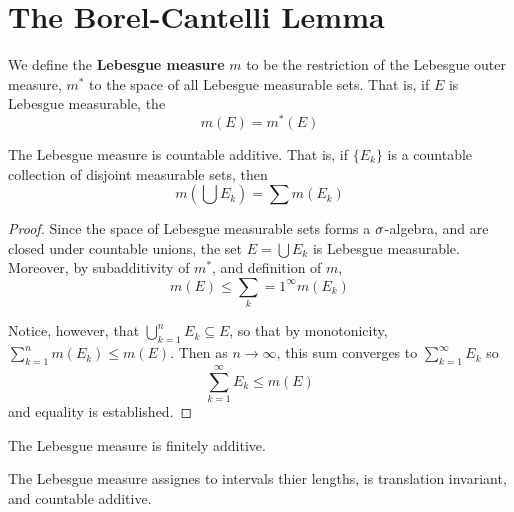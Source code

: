 \section{The Borel-Cantelli Lemma}

\begin{definition}
    We define the \textbf{Lebesgue measure} $m$ to be the restriction of the
    Lebesgue outer measure, $m^\ast$ to the space of all Lebesgue measurable
    sets. That is, if $E$ is Lebesgue measurable, the
    \begin{equation*}
        m(E)=m^\ast(E)
    \end{equation*}
\end{definition}

\begin{lemma}\label{2.4.1}
    The Lebesgue measure is countable additive. That is, if $\{E_k\}$ is a
    countable collection of disjoint measurable sets, then
    \begin{equation*}
        m(\bigcup{E_k})=\sum{m(E_k)}
    \end{equation*}
\end{lemma}
\begin{proof}
    Since the space of Lebesgue measurable sets forms a $\sigma$-algebra, and are
    closed under countable unions, the set  $E=\bigcup{E_k}$ is Lebesgue
    measurable. Moreover, by subadditivity of $m^\ast$, and definition of $m$,
    \begin{equation*}
        m(E) \leq \sum_k=1^\infty{m(E_k)}
    \end{equation*}

    Notice, however, that $\bigcup_{k=1}^n{E_k} \subseteq E$, so that by
    monotonicity, $\sum_{k=1}^n{m(E_k)} \leq m(E)$. Then as $n \xrightarrow{}
    \infty$, this sum converges to $\sum_{k=1}^\infty{E_k}$ so
    \begin{equation*}
        \sum_{k=1}^\infty{E_k} \leq m(E)
    \end{equation*}
    and equality is established.
\end{proof}
\begin{corollary}
    The Lebesgue measure is finitely additive.
\end{corollary}

\begin{theorem}\label{2.4.2}
    The Lebesgue measure assignes to intervals thier lengths, is translation
    invariant, and countable additive.
\end{theorem}

